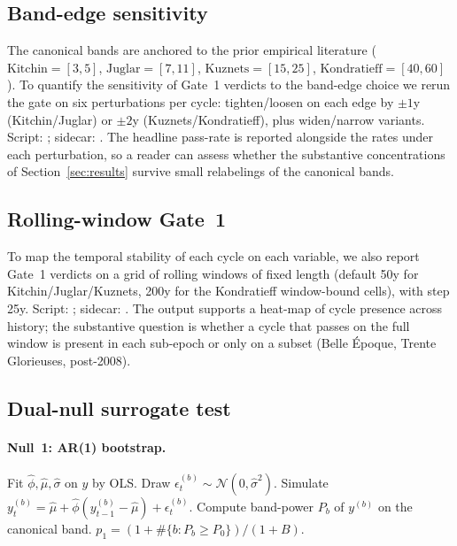 \subsection{Band-edge sensitivity}
\label{sec:band_sensitivity}

The canonical bands are anchored to the prior empirical literature
(\(\text{Kitchin}=[3,5]\), \(\text{Juglar}=[7,11]\),
\(\text{Kuznets}=[15,25]\), \(\text{Kondratieff}=[40,60]\)). To
quantify the sensitivity of Gate~1 verdicts to the band-edge
choice we rerun the gate on six perturbations per cycle:
tighten/loosen on each edge by \(\pm 1\)y (Kitchin/Juglar) or
\(\pm 2\)y (Kuznets/Kondratieff), plus widen/narrow variants.
Script: ; sidecar:
. The headline pass-rate is
reported alongside the rates under each perturbation, so a
reader can assess whether the substantive concentrations of
Section~\ref{sec:results} survive small relabelings of the
canonical bands.

\subsection{Rolling-window Gate~1}
\label{sec:rolling_windows}

To map the temporal stability of each cycle on each variable, we
also report Gate~1 verdicts on a grid of rolling windows of fixed
length (default 50y for Kitchin/Juglar/Kuznets, 200y for the
Kondratieff window-bound cells), with step 25y. Script:
; sidecar:
. The output supports a
heat-map of cycle presence across history; the substantive
question is whether a cycle that passes on the full window is
present in each sub-epoch or only on a subset (Belle \'Epoque,
Trente Glorieuses, post-2008).

\subsection{Dual-null surrogate test}

\paragraph{Null~1: AR(1) bootstrap.}
\begin{algorithmic}[1]
\State Fit \(\hat\phi,\hat\mu,\hat\sigma\) on \(y\) by OLS.
  \State Draw \(\epsilon^{(b)}_t\sim\mathcal{N}(0,\hat\sigma^2)\).
  \State Simulate \(y^{(b)}_t = \hat\mu + \hat\phi(y^{(b)}_{t-1}-\hat\mu)+\epsilon^{(b)}_t\).
  \State Compute band-power \(P_b\) of \(y^{(b)}\) on the canonical band.
\EndFor
\State \(p_1 = (1+\#\{b: P_b\geq P_0\})/(1+B)\).
\end{algorithmic}

